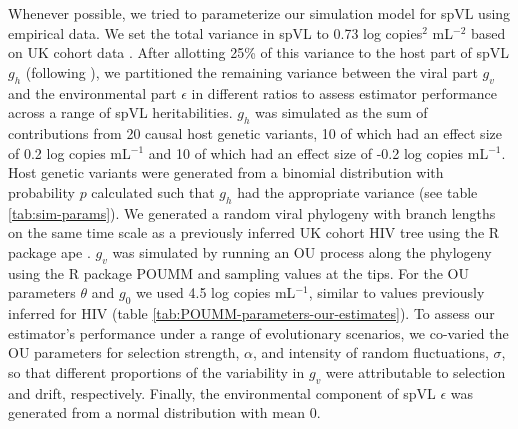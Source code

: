 \documentclass[]{article}
\begin{document}
\begin{doublespace}
Whenever possible, we tried to parameterize our simulation model for spVL using empirical data. We set the total variance in spVL to 0.73 log copies$^2$ mL$^{-2}$ based on UK cohort data \citep{Mitov2018}. After allotting 25\% of this variance to the host part of spVL $g_h$ (following \citet{McLaren2015}), we partitioned the remaining variance between the viral part $g_v$ and the environmental part $\epsilon$ in different ratios to assess estimator performance across a range of spVL heritabilities. $g_h$ was simulated as the sum of contributions from 20 causal host genetic variants, 10 of which had an effect size of 0.2 log copies mL$^{-1}$ and 10 of which had an effect size of -0.2 log copies mL$^{-1}$. Host genetic variants were generated from a binomial distribution with probability $p$ calculated such that $g_h$ had the appropriate variance (see table \ref{tab:sim-params}). We generated a random viral phylogeny with branch lengths on the same time scale as a previously inferred UK cohort HIV tree \citep{Hodcroft2014} using the R package ape \citep{Paradis2018}. $g_v$ was simulated by running an OU process along the phylogeny using the R package POUMM \citep{Mitov2017a-POUMM} and sampling values at the tips. For the OU parameters $\theta$ and $g_{0}$ we used 4.5 log copies mL$^{-1}$, similar to values previously inferred for HIV (table \ref{tab:POUMM-parameters-our-estimates}). To assess our estimator's performance under a range of evolutionary scenarios, we co-varied the OU parameters for selection strength, $\alpha$, and intensity of random fluctuations, $\sigma$, so that different proportions of the variability in $g_v$ were attributable to selection and drift, respectively. Finally, the environmental component of spVL $\epsilon$ was generated from a normal distribution with mean 0.


\end{doublespace}
\end{document}
